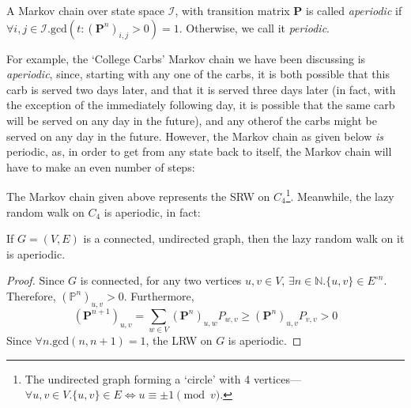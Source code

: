 			\begin{definition}[Periodicity]
				A Markov chain over state space $\mathcal{I}$, with transition matrix 
				$\mathbf{P}$ is called \emph{aperiodic} if $\forall i,j\in \mathcal{I}. 
				\mathrm{gcd}(t : (\mathbf{P}^n)_{i,j} > 0) = 1$. Otherwise, we call it 
				\emph{periodic}.
			\end{definition}
			For example, the `College Carbs' Markov chain we have been discussing is 
			\emph{aperiodic}, since, starting with any one of the carbs, it is both possible that
			this carb is served two days later, and that it is served three days later (in fact, 
			with the exception of the immediately following day, it is possible that the same carb
			will be served on any day in the future), and any otherof the carbs might be served on 
			any day in the future. However, the Markov chain as given below \emph{is} periodic,
			as, in order to get from any state back to itself, the Markov chain will have to 
			make an even number of steps:
			\begin{center}
			\end{center}

			The Markov chain given above represents the SRW on $C_4$\footnote{The undirected graph 
			forming a `circle' with 4 vertices---$\forall u,v \in V. \{u,v\} \in E \iff u \equiv
			\pm 1 \pmod v$.}. Meanwhile, the lazy random walk on $C_4$ is aperiodic, in fact:
			\begin{lemma}
				If $G = (V, E)$ is a connected, undirected graph, then the lazy random walk on
				it is aperiodic.
			\end{lemma}
			\begin{proof}
				Since $G$ is connected, for any two vertices $u,v \in V$, $\exists n \in 
				\mathbb{N}. \{u, v\} \in E^{\circ n}$. Therefore, $(\mathbb{P}^n)_{u,v} > 0$. 
				Furthermore, 
				$$
					(\mathbf{P}^{n+1})_{u,v} = \sum_{w \in V} (\mathbf{P}^n)_{u, w} P_{w,v}
					\geq (\mathbf{P}^n)_{u,v} P_{v,v} > 0
				$$
				Since $\forall n. \mathrm{gcd}(n, n+1) = 1$, the LRW on $G$ is aperiodic.
			\end{proof}

